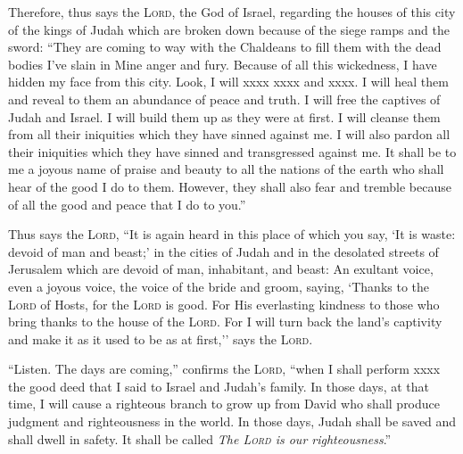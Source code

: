 
\begin{inparaenum}
  
   Therefore, thus says the \textsc{Lord}, the God of Israel, regarding the houses of this city of the kings of Judah which are broken down because of the siege ramps and the sword:%
   ``They are coming to way with the Chaldeans to fill them with the dead bodies I've slain in Mine anger and fury. Because of all this wickedness, I have hidden my face from this city.%
   Look, I will xxxx xxxx and xxxx. I will heal them and reveal to them an abundance of peace and truth.%
   I will free the captives of Judah and Israel. I will build them up as they were at first.%
   I will cleanse them from all their iniquities which they have sinned against me. I will also pardon all their iniquities which they have sinned and transgressed against me.%
   It shall be to me a joyous name of praise and beauty to all the nations of the earth who shall hear of the good I do to them. However, they shall also fear and tremble because of all the good and peace that I do to you.''%
  
   Thus says the \textsc{Lord}, ``It is again heard in this place of which you say, `It is waste: devoid of man and beast;' in the cities of Judah and in the desolated streets of Jerusalem which are devoid of man, inhabitant, and beast:%
   An exultant voice, even a joyous voice, the voice of the bride and groom, saying, `Thanks to the \textsc{Lord} of Hosts, for the \textsc{Lord} is good. For His everlasting kindness to those who bring thanks to the house of the \textsc{Lord}. For I will turn back the land's captivity and make it as it used to be as at first,'' says the \textsc{Lord}.%
  
  
   ``Listen. The days are coming,'' confirms the \textsc{Lord}, ``when I shall perform xxxx the good deed that I said to Israel and Judah's family.%
   In those days, at that time, I will cause a righteous branch to grow up from David who shall produce judgment and righteousness in the world.%
   In those days, Judah shall be saved and shall dwell in safety. It shall be called \textit{The \textsc{Lord} is our righteousness}.''%
  

\end{inparaenum}
